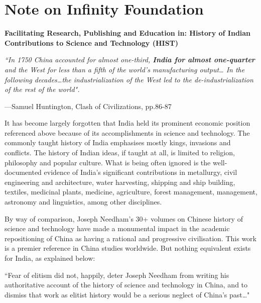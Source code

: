\chapter*{Note on Infinity Foundation}\label{preface3}

\vspace{-.8cm}


\textbf{Facilitating Research, Publishing and Education in: History of Indian Contributions to Science and Technology (HIST)}

\begin{myquote}
\it{“In 1750 China accounted for almost one-third, \textbf{India for almost one-quarter} and the West for less than a fifth of the world’s manufacturing output… In the following decades…the industrialization of the West led to the de-industrialization of the rest of the world".}
\end{myquote}

\vspace{-.3cm}

\begin{flushright}
 —Samuel Huntington, Clash of Civilizations, pp.86-87
\end{flushright}

It has become largely forgotten that India held its prominent economic position referenced above because of its accomplishments in science and technology. The commonly taught history of India emphasises mostly kings, invasions and conflicts. The history of Indian ideas, if taught at all, is limited to religion, philosophy and popular culture. What is being often ignored is the well-documented evidence of India’s significant contributions in metallurgy, civil engineering and architecture, water harvesting, shipping and ship building, textiles, medicinal plants, medicine, agriculture, forest management, management, astronomy and linguistics, among other disciplines.

By way of comparison, Joseph Needham’s 30+ volumes on Chinese history of science and technology have made a monumental impact in the academic repositioning of China as having a rational and progressive civilisation. This work is a premier reference in China studies worldwide. But nothing equivalent exists for India, as explained below:

\begin{myquote}
“Fear of elitism did not, happily, deter Joseph Needham from writing his authoritative account of the history of science and technology in China, and to dismiss that work as elitist history would be a serious neglect of China’s past…"
\end{myquote}

